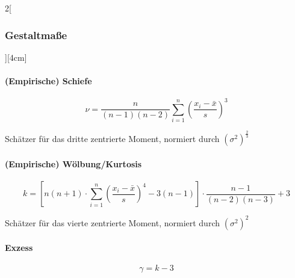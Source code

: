 \documentclass[8pt]{extarticle}
\begin{document}
\begin{multicols}{2}[\subsubsection{Gestaltmaße}][4cm] 

\paragraph{(Empirische) Schiefe}
$$\nu = \frac{n}{(n-1)(n-2)} \sum_{i=1}^n \left(\frac{x_i-\bar{x}}{s}\right)^3$$

\noindent Schätzer für das dritte zentrierte Moment, normiert durch $(\sigma^2)^{\frac{2}{3}}$

\paragraph{(Empirische) Wölbung/Kurtosis}

$$k=\left[n(n+1) \cdot \sum_{i=1}^n \left(\frac{x_i-\bar{x}}{s}\right)^4 - 3(n-1)\right] \cdot \frac{n-1}{(n-2)(n-3)}+3$$

\noindent Schätzer für das vierte zentrierte Moment, normiert durch $(\sigma^2)^2$

\paragraph{Exzess}

$$\gamma=k-3$$

\end{multicols}
\end{document}
